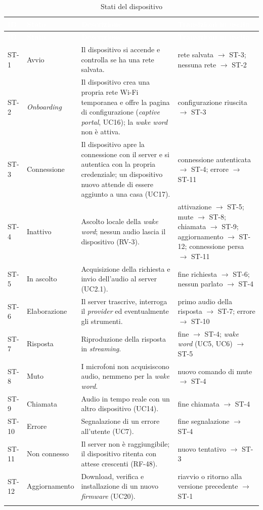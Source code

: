 \documentclass[12pt,a4paper]{article}
\newcommand{\thc}[1]{\textcolor{white}{\textbf{#1}}}
\newcommand{\rl}{\\ \arrayrulecolor{bfline}\hline}
\begin{document}
\begin{longtable}{>{\raggedright\arraybackslash}p{}>{\raggedright\arraybackslash}p{}>{\raggedright\arraybackslash}p{}>{\raggedright\arraybackslash}p{}}
\caption{Stati del dispositivo}\label{tab:stati}\\
\rowcolor{bfblue}\thc{ID} & \thc{Stato} & \thc{Descrizione} & \thc{Transizioni in uscita} \\
\endfirsthead
\rowcolor{bfblue}\thc{ID} & \thc{Stato} & \thc{Descrizione} & \thc{Transizioni in uscita} \\
\endhead
ST-1 & Avvio & Il dispositivo si accende e controlla se ha una rete salvata. & rete salvata $\rightarrow$ ST-3; nessuna rete $\rightarrow$ ST-2 \rl
ST-2 & \emph{Onboarding} & Il dispositivo crea una propria rete Wi-Fi temporanea e offre la pagina di configurazione (\emph{captive portal}, UC16); la \emph{wake word} non è attiva. & configurazione riuscita $\rightarrow$ ST-3 \rl
ST-3 & Connessione & Il dispositivo apre la connessione con il server e si autentica con la propria credenziale; un dispositivo nuovo attende di essere aggiunto a una casa (UC17). & connessione autenticata $\rightarrow$ ST-4; errore $\rightarrow$ ST-11 \rl
ST-4 & Inattivo & Ascolto locale della \emph{wake word}; nessun audio lascia il dispositivo (RV-3). & attivazione $\rightarrow$ ST-5; mute $\rightarrow$ ST-8; chiamata $\rightarrow$ ST-9; aggiornamento $\rightarrow$ ST-12; connessione persa $\rightarrow$ ST-11 \rl
ST-5 & In ascolto & Acquisizione della richiesta e invio dell'audio al server (UC2.1). & fine richiesta $\rightarrow$ ST-6; nessun parlato $\rightarrow$ ST-4 \rl
ST-6 & Elaborazione & Il server trascrive, interroga il \emph{provider} ed eventualmente gli strumenti. & primo audio della risposta $\rightarrow$ ST-7; errore $\rightarrow$ ST-10 \rl
ST-7 & Risposta & Riproduzione della risposta in \emph{streaming}. & fine $\rightarrow$ ST-4; \emph{wake word} (UC5, UC6) $\rightarrow$ ST-5 \rl
ST-8 & Muto & I microfoni non acquisiscono audio, nemmeno per la \emph{wake word}. & nuovo comando di mute $\rightarrow$ ST-4 \rl
ST-9 & Chiamata & Audio in tempo reale con un altro dispositivo (UC14). & fine chiamata $\rightarrow$ ST-4 \rl
ST-10 & Errore & Segnalazione di un errore all'utente (UC7). & fine segnalazione $\rightarrow$ ST-4 \rl
ST-11 & Non connesso & Il server non è raggiungibile; il dispositivo ritenta con attese crescenti (RF-48). & nuovo tentativo $\rightarrow$ ST-3 \rl
ST-12 & Aggiornamento & Download, verifica e installazione di un nuovo \emph{firmware} (UC20). & riavvio o ritorno alla versione precedente $\rightarrow$ ST-1 \rl
\end{longtable}
\end{document}

